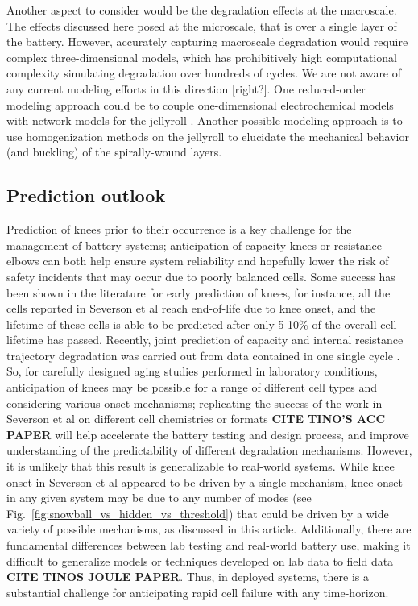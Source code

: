 \documentclass[journal=jpclcd,manuscript=article]{achemso}
\begin{document}
Another aspect to consider would be the degradation effects at the macroscale. The effects discussed here posed at the microscale, that is over a single layer of the battery. However, accurately capturing macroscale degradation would require complex three-dimensional models, which has prohibitively high computational complexity simulating degradation over hundreds of cycles. We are not aware of any current modeling efforts in this direction [right?]. One reduced-order modeling approach could be to couple one-dimensional electrochemical models with network models for the jellyroll \cite{tranter_probing_2020}. Another possible modeling approach is to use homogenization methods on the jellyroll \cite{psaltis_homogenisation_2020} to elucidate the mechanical behavior (and buckling) of the spirally-wound layers.

\subsection{Prediction outlook}
Prediction of knees prior to their occurrence is a key challenge for the management of battery systems; anticipation of capacity knees or resistance elbows can both help ensure system reliability and hopefully lower the risk of safety incidents that may occur due to poorly balanced cells. Some success has been shown in the literature for early prediction of knees, for instance, all the cells reported in Severson et al \cite{severson_data-driven_2019} reach end-of-life due to knee onset, and the lifetime of these cells is able to be predicted after only 5-10\% of the overall cell lifetime has passed. Recently, joint prediction of  capacity and internal resistance trajectory degradation was carried out from data contained in one single cycle \cite{strange_prediction_2021}. 
So, for carefully designed aging studies performed in laboratory conditions, anticipation of knees may be possible for a range of different cell types and considering various onset mechanisms; replicating the success of the work in Severson et al on different cell chemistries or formats \textbf{CITE TINO'S ACC PAPER} will help accelerate the battery testing and design process, and improve understanding of the predictability of different degradation mechanisms. However, it is unlikely that this result is generalizable to real-world systems. While knee onset in Severson et al \cite{severson_data-driven_2019} appeared to be driven by a single mechanism, knee-onset in any given system may be due to any number of modes (see Fig.~\ref{fig:snowball_vs_hidden_vs_threshold}) that could be driven by a wide variety of possible mechanisms, as discussed in this article. Additionally, there are fundamental differences between lab testing and real-world battery use, making it difficult to generalize models or techniques developed on lab data to field data \textbf{CITE TINOS JOULE PAPER}. Thus, in deployed systems, there is a substantial challenge for anticipating rapid cell failure with any time-horizon.
\end{document}
